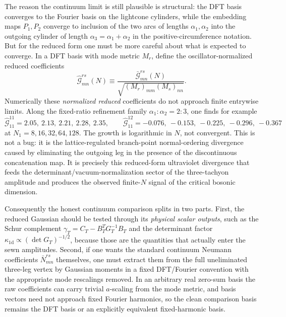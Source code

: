 \documentclass[11pt]{article}
\numberwithin{equation}{section}
\begin{document}
The reason the continuum limit is still plausible is structural: the DFT basis converges to the Fourier basis on the lightcone cylinders, while the embedding maps $P_1,P_2$ converge to inclusion of the two arcs of lengths $\alpha_1,\alpha_2$ into the outgoing cylinder of length $\alpha_3=\alpha_1+\alpha_2$ in the positive-circumference notation. But for the reduced form one must be more careful about what is expected to converge. In a DFT basis with mode metric $M_r$, define the oscillator-normalized reduced coefficients
\begin{equation}
\label{eq:s16-004}
\widehat{\mathcal G}^{rs}_{mn}(N)
\equiv
\frac{\bar{\mathcal G}^{rs}_{mn}(N)}{\sqrt{(M_r)_{mm}(M_s)_{nn}}}.
\end{equation}
Numerically these \emph{normalized reduced} coefficients do not approach finite entrywise limits. Along the fixed-ratio refinement family $\alpha_1:\alpha_2=2:3$, one finds for example
\begin{equation}
\label{eq:s16-005}
\widehat{\mathcal G}^{11}_{11}
=
2.05,\ 2.13,\ 2.21,\ 2.28,\ 2.35,
\qquad
\widehat{\mathcal G}^{12}_{11}
=
-0.076,\ -0.153,\ -0.225,\ -0.296,\ -0.367
\end{equation}
at $N_1=8,16,32,64,128$. The growth is logarithmic in $N$, not convergent. This is not a bug: it is the lattice-regulated branch-point normal-ordering divergence caused by eliminating the outgoing leg in the presence of the discontinuous concatenation map. It is precisely this reduced-form ultraviolet divergence that feeds the determinant/vacuum-normalization sector of the three-tachyon amplitude and produces the observed finite-$N$ signal of the critical bosonic dimension.

Consequently the honest continuum comparison splits in two parts. First, the reduced Gaussian should be tested through its \emph{physical scalar outputs}, such as the Schur complement $\gamma_T=C_T-B_T^TG_T^{-1}B_T$ and the determinant factor $\kappa_{1\mathrm d}\propto (\det G_T)^{-1/2}$, because those are the quantities that actually enter the sewn amplitudes. Second, if one wants the standard continuum Neumann coefficients $\bar N^{rs}_{mn}$ themselves, one must extract them from the full uneliminated three-leg vertex by Gaussian moments in a fixed DFT/Fourier convention with the appropriate mode rescalings removed. In an arbitrary real zero-sum basis the raw coefficients can carry trivial $a$-scaling from the mode metric, and basis vectors need not approach fixed Fourier harmonics, so the clean comparison basis remains the DFT basis or an explicitly equivalent fixed-harmonic basis.
\end{document}
